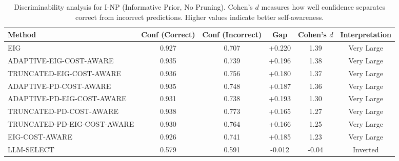 \begin{table}[htbp]
\centering
\small
\caption{Discriminability analysis for I-NP (Informative Prior, No Pruning). Cohen's $d$ measures how well confidence separates correct from incorrect predictions. Higher values indicate better self-awareness.}
\label{tab:discriminability-notprune_notuniform}
\begin{tabular}{@{}lccccc@{}}
\toprule
Method & Conf (Correct) & Conf (Incorrect) & Gap & Cohen's $d$ & Interpretation \\
\midrule
EIG & 0.927 & 0.707 & +0.220 & 1.39 & Very Large \\
ADAPTIVE-EIG-COST-AWARE & 0.935 & 0.739 & +0.196 & 1.38 & Very Large \\
TRUNCATED-EIG-COST-AWARE & 0.936 & 0.756 & +0.180 & 1.37 & Very Large \\
ADAPTIVE-PD-COST-AWARE & 0.935 & 0.748 & +0.187 & 1.36 & Very Large \\
ADAPTIVE-PD-EIG-COST-AWARE & 0.931 & 0.738 & +0.193 & 1.30 & Very Large \\
TRUNCATED-PD-COST-AWARE & 0.938 & 0.773 & +0.165 & 1.27 & Very Large \\
TRUNCATED-PD-EIG-COST-AWARE & 0.930 & 0.764 & +0.166 & 1.25 & Very Large \\
EIG-COST-AWARE & 0.926 & 0.741 & +0.185 & 1.23 & Very Large \\
LLM-SELECT & 0.579 & 0.591 & -0.012 & -0.04 & Inverted \\
\bottomrule
\end{tabular}
\end{table}